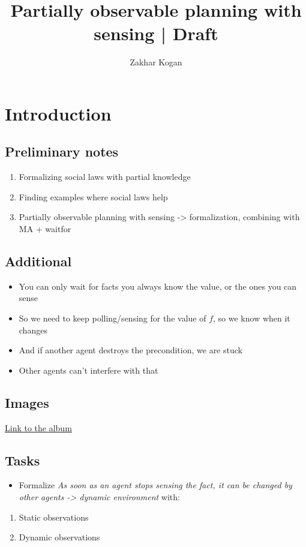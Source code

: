 \documentclass[fleqn,10pt]{olplainarticle}
\title{Partially observable planning with sensing | Draft}
\author[1]{Zakhar Kogan}
\affil[1]{zakhark@technion.ac.il}
\begin{document}
\flushbottom
\maketitle
\section*{Introduction} \label{intro}
\subsection{Preliminary notes}
\begin{enumerate}
    \item Formalizing social laws with partial knowledge
    \item Finding examples where social laws help
    \item Partially observable planning with sensing -> formalization, combining with MA + waitfor
\end{enumerate}
\subsection{Additional}
\begin{itemize}
    \item You can only wait for facts you always know the value, or the ones you can sense
    \item So we need to keep polling/sensing for the value of $f$, so we know when it changes
    \item And if another agent destroys the precondition, we are stuck
    \item Other agents can't interfere with that
\end{itemize}
\subsection{Images}
\href{https://photos.app.goo.gl/BBTc944Szh7fuWvw5}{Link to the album}
\subsection{Tasks}
\begin{itemize}
    \item Formalize \textit{As soon as an agent stops sensing the fact, it can be changed by other agents -> dynamic environment} with:
\end{itemize}
\begin{enumerate}
        \item Static observations
        \item Dynamic observations
\end{enumerate}
\end{document}
